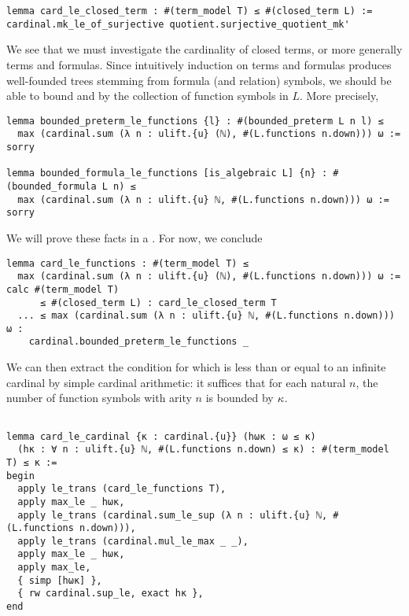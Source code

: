 \begin{lstlisting}
lemma card_le_closed_term : #(term_model T) ≤ #(closed_term L) :=
cardinal.mk_le_of_surjective quotient.surjective_quotient_mk' \end{lstlisting}

We see that we must investigate the cardinality of
closed terms, or more generally terms and formulas.
Since intuitively induction on terms and formulas
produces well-founded trees stemming from formula (and relation) symbols,
we should be able to bound 
and  by the collection of function symbols in $L$.
More precisely,
\begin{lstlisting}
lemma bounded_preterm_le_functions {l} : #(bounded_preterm L n l) ≤
  max (cardinal.sum (λ n : ulift.{u} (ℕ), #(L.functions n.down))) ω := sorry

lemma bounded_formula_le_functions [is_algebraic L] {n} : #(bounded_formula L n) ≤
  max (cardinal.sum (λ n : ulift.{u} ℕ, #(L.functions n.down))) ω := sorry \end{lstlisting}

We will prove these facts in a .
For now, we conclude

\begin{lstlisting}
lemma card_le_functions : #(term_model T) ≤
  max (cardinal.sum (λ n : ulift.{u} (ℕ), #(L.functions n.down))) ω :=
calc #(term_model T)
      ≤ #(closed_term L) : card_le_closed_term T
  ... ≤ max (cardinal.sum (λ n : ulift.{u} ℕ, #(L.functions n.down))) ω :
    cardinal.bounded_preterm_le_functions _ \end{lstlisting}

We can then extract the condition for which  is
less than or equal to an infinite cardinal by simple cardinal
arithmetic: it suffices that for each natural $n$,
the number of function symbols with arity $n$ is bounded by $\kappa$.

\begin{lstlisting}

lemma card_le_cardinal {κ : cardinal.{u}} (hωκ : ω ≤ κ)
  (hκ : ∀ n : ulift.{u} ℕ, #(L.functions n.down) ≤ κ) : #(term_model T) ≤ κ :=
begin
  apply le_trans (card_le_functions T),
  apply max_le _ hωκ,
  apply le_trans (cardinal.sum_le_sup (λ n : ulift.{u} ℕ, #(L.functions n.down))),
  apply le_trans (cardinal.mul_le_max _ _),
  apply max_le _ hωκ,
  apply max_le,
  { simp [hωκ] },
  { rw cardinal.sup_le, exact hκ },
end \end{lstlisting}

